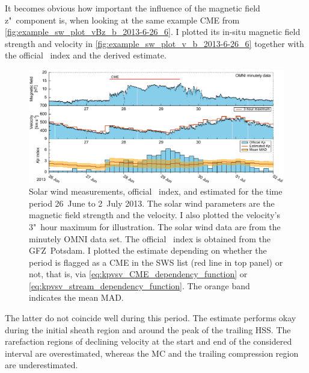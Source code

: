 It becomes obvious how important the influence of the magnetic field z"~component is, when looking at the same example CME from \autoref{fig:example_sw_plot_vBz_b_2013-6-26_6}. I plotted its in-situ magnetic field strength and velocity in \autoref{fig:example_sw_plot_v_b_2013-6-26_6} together with the official \Kp{}~index and the derived \Kp{} estimate.
\begin{figure}[htb]
	\centering
	\includegraphics[width=\textwidth]{figures_of_mine/chapter2/example_sw_plot_v_b_2013-6-26_6.pdf}
	\caption[]
	{Solar wind measurements, official \Kp{}~index, and estimated \Kp{} for the time period 26~June to 2~July 2013. The solar wind parameters are the magnetic field strength and the velocity. I also plotted the velocity's 3"~hour maximum for illustration. The solar wind data are from the minutely OMNI data set. The official \Kp{}~index is obtained from the GFZ~Potsdam. I plotted the \Kp{} estimate depending on whether the period is flagged as a CME in the SWS list (red line in top panel) or not, that is, via \autoref{eq:kpvsv_CME_dependency_function} or \autoref{eq:kpvsv_stream_dependency_function}. The orange band indicates the mean MAD.}
	\label{fig:example_sw_plot_v_b_2013-6-26_6}
\end{figure}
The latter do not coincide well during this period. The \Kp{} estimate performs okay during the initial sheath region and around the peak of the trailing HSS. The rarefaction regions of declining velocity at the start and end of the considered interval are overestimated, whereas the MC and the trailing compression region are underestimated.\\


